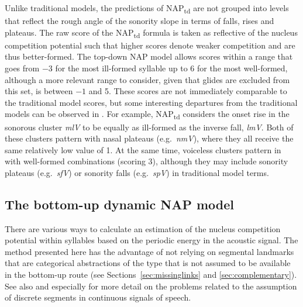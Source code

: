 Unlike traditional models, the predictions of NAP\textsubscript{td} are not grouped into levels that reflect the rough angle of the sonority slope in terms of falls, rises and plateaus. The raw score of the NAP\textsubscript{td} formula is taken as reflective of the nucleus competition potential such that higher scores denote weaker competition and are thus better-formed.
The top-down NAP model allows scores within a range that goes from $-3$ for the most ill-formed syllable up to 6 for the most well-formed, although a more relevant range to consider, given that glides are excluded from this set, is between $-1$ and 5. These scores are not immediately comparable to the traditional model scores, but some interesting departures from the traditional models can be observed in . For example, NAP\textsubscript{td} considers the onset rise in the sonorous cluster \emph{mlV} to be equally as ill-formed as the inverse fall, \emph{lmV}. Both of these clusters pattern with nasal plateaus (e.g.~\emph{nmV}), where they all receive the same relatively low value of 1. At the same time, voiceless clusters pattern in with well-formed combinations (scoring 3), although they may include sonority plateaus (e.g.~\emph{sfV}) or sonority falls (e.g.~\emph{spV}) in traditional model terms.

\subsection{The bottom-up dynamic NAP model}\label{sec:napbu}

There are various ways to calculate an estimation of the nucleus competition potential within syllables based on the periodic energy in the acoustic signal. The method presented here has the advantage of not relying on segmental landmarks that are categorical abstractions of the type that is not assumed to be available in the bottom-up route
(see Sections~\ref{sec:missinglinks} and \ref{sec:complementary}).
See also  and especially  for more detail on the problems related to the assumption of discrete segments in continuous signals of speech.

